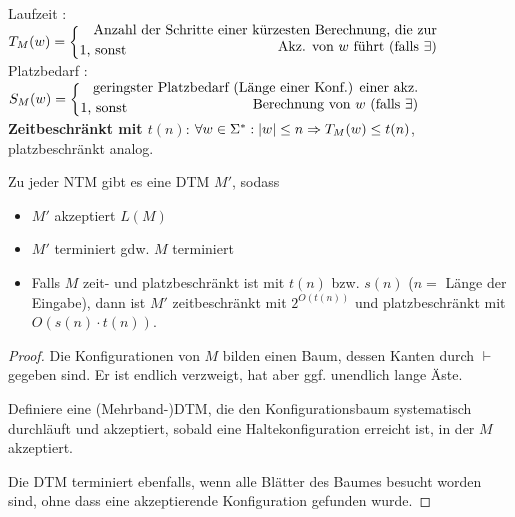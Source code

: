 {\begin{Def}[name={[Laufzeit und Platzbedarf einer \acs*{TM}]}]
	Laufzeit : $T_M(w) =
	\begin{cases}
		\parbox{.74\textwidth}{\raggedleft Anzahl der Schritte einer kürzesten Berechnung, die zur Akz. von $w$ führt (falls $\exists$)}\\[-1em]
		\text{1, sonst}
	\end{cases}
	$\\
	Platzbedarf : $S_M(w) =
	\begin{cases}
		\parbox{.7\textwidth}{\raggedleft geringster Platzbedarf (Länge einer Konf.) einer akz. Berechnung von $w$ (falls $\exists$)}\\[-1em]
		\text{1, sonst}
	\end{cases}
	$
\textbf{Zeitbeschränkt mit $t(n)$}: $\forall w\in\Sigma^*: |w|\leq n \=> T_M(w)\leq t(n)$,\\
platzbeschränkt analog.
\end{Def}
\begin{Satz}[name={[Zu jeder \acs*{NTM} gibt es \acs*{DTM}]}]\label{satz:6.1}
	Zu jeder \ac{NTM} gibt es eine \ac{DTM} $M'$, sodass
	\begin{itemize}
	\item $M'$ akzeptiert $L(M)$
	\item $M'$ terminiert gdw. $M$ terminiert
	\item Falls $M$ zeit- und platzbeschränkt ist mit $t(n)$
          bzw. $s(n)$ ($n=$ Länge der Eingabe), dann ist $M'$
          zeitbeschränkt mit $2^{O(t(n))}$ und platzbeschränkt mit
          $O(s(n)\cdot t(n))$. 
	\end{itemize}
\end{Satz}\vspace{-2em}
\begin{proof}
	Die Konfigurationen von $M$ bilden einen Baum, dessen Kanten durch $\vdash$ gegeben sind. Er ist endlich verzweigt, hat aber ggf. unendlich lange Äste.
	
	Definiere eine (Mehrband-)\ac{DTM}, die den Konfigurationsbaum
        systematisch durchläuft und akzeptiert, sobald eine
        Haltekonfiguration erreicht ist, in der $M$ akzeptiert. 
	
	Die \ac{DTM} terminiert ebenfalls, wenn alle Blätter des Baumes besucht worden sind, ohne dass eine akzeptierende Konfiguration gefunden wurde.
	

\end{proof}}
